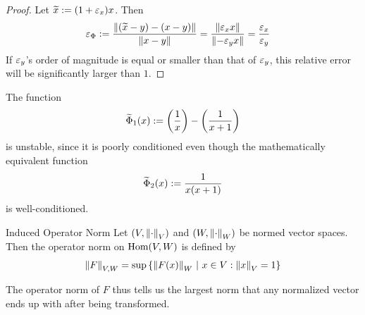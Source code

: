 \begin{proof}
	Let $\widetilde x := (1 + \varepsilon_x)x$. Then
	\begin{align*}
		\varepsilon_\Phi := \frac{\norm{(\widetilde x - y) - (x - y)}}{\norm{x-y}}
		&=
		\frac{\norm{\varepsilon_x x}}{\norm{-\varepsilon_y x}} =
		\frac{\varepsilon_x}{\varepsilon_y}
	\end{align*}
	If $\varepsilon_y$'s order of magnitude is equal or smaller than that of $\varepsilon_y$, 
	this relative error will be significantly larger than $1$.
\end{proof}
\begin{corollary}
	The function
	\begin{align*}
		\widetilde \Phi_1(x)
		:= 
		\qty(\frac{1}{x}) - \qty(\frac{1}{x+1})
	\end{align*}
	is unstable, since it
	is poorly conditioned even though the mathematically equivalent function
	\begin{align*}
		\widetilde \Phi_2(x)
		:=
		\frac{1}{x(x+1)}
	\end{align*}
	is well-conditioned.
\end{corollary}

\begin{importantdefinition}{Induced Operator Norm}{}
	Let $(V, \norm{\cdot}_V)$ and $(W, \norm{\cdot}_W)$ be normed vector spaces. Then the operator norm on $\textnormal{Hom}(V,W)$ is defined by
	\begin{align*}
		\norm{F}_{V,W} = \sup \qty{\norm{F(x)}_W ~\middle|~x \in V : \norm{x}_V = 1}
	\end{align*}
\end{importantdefinition}
The operator norm of $F$ thus tells us the largest norm that any normalized vector ends up with after being transformed.

